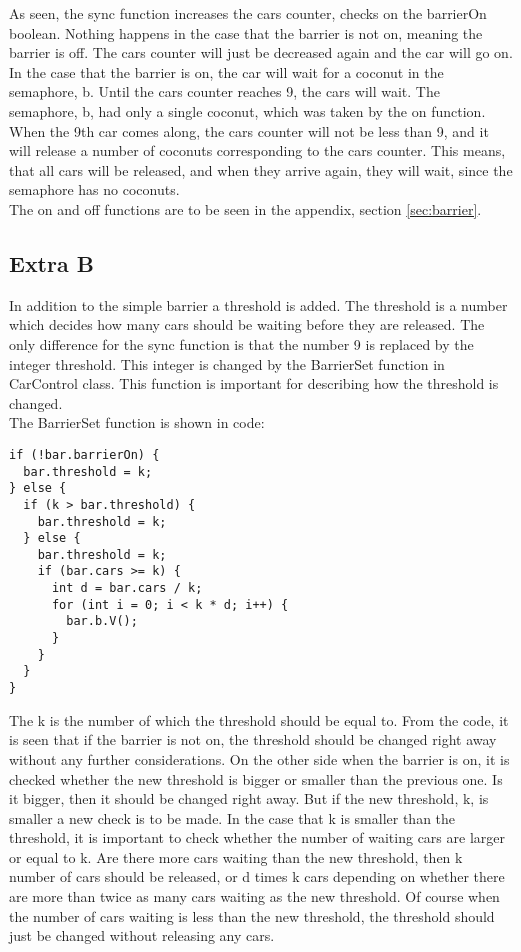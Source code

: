 As seen, the sync function increases the cars counter, checks on the barrierOn boolean. Nothing happens in the case that the barrier is not on, meaning the barrier is off. The cars counter will just be decreased again and the car will go on. \\
In the case that the barrier is on, the car will wait for a coconut in the semaphore, b. Until the cars counter reaches 9, the cars will wait. The semaphore, b, had only a single coconut, which was taken by the on function. When the 9th car comes along, the cars counter will not be less than 9, and it will release a number of coconuts corresponding to the cars counter. This means, that all cars will be released, and when they arrive again, they will wait, since the semaphore has no coconuts. \\
The on and off functions are to be seen in the appendix, section \ref{sec:barrier}.

\subsection{Extra B}
In addition to the simple barrier a threshold is added. The threshold is a number which decides how many cars should be waiting before they are released. The only difference for the sync function is that the number 9 is replaced by the integer threshold. This integer is changed by the BarrierSet function in CarControl class. This function is important for describing how the threshold is changed.\\
The BarrierSet function is shown in code:

\begin{lstlisting}
if (!bar.barrierOn) {
  bar.threshold = k;
} else {
  if (k > bar.threshold) {
    bar.threshold = k;
  } else {
    bar.threshold = k;
    if (bar.cars >= k) {
      int d = bar.cars / k;
      for (int i = 0; i < k * d; i++) {
        bar.b.V();
      }
    }
  }
}
\end{lstlisting}
\vspace{.8cm}

The k is the number of which the threshold should be equal to. From the code, it is seen that if the barrier is not on, the threshold should be changed right away without any further considerations. On the other side when the barrier is on, it is checked whether the new threshold is bigger or smaller than the previous one. Is it bigger, then it should be changed right away. But if the new threshold, k, is smaller a new check is to be made. In the case that k is smaller than the threshold, it is important to check whether the number of waiting cars are larger or equal to k. Are there more cars waiting than the new threshold, then k number of cars should be released, or d times k cars depending on whether there are more than twice as many cars waiting as the new threshold. Of course when the number of cars waiting is less than the new threshold, the threshold should just be changed without releasing any cars.